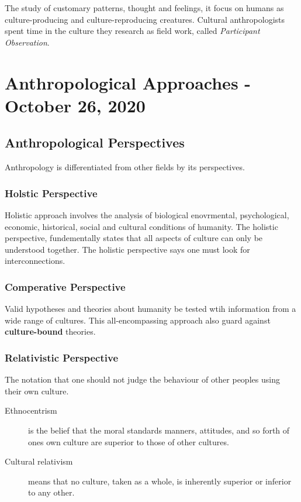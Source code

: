 \documentclass[11pt,a4paper]{book}
\begin{document}
The study of customary patterns, thought and feelings, it focus on humans as culture-producing and culture-reproducing creatures. Cultural anthropologists spent time in the culture they research as field work, called \textit{Participant Observation}\unsure.

\chapter{Anthropological Approaches - October 26, 2020}

\section{Anthropological Perspectives}

Anthropology is differentiated from other fields by its perspectives.

\subsection{Holstic Perspective}

Holistic approach involves the analysis of biological enovrmental, psychological, economic, historical, social and cultural conditions of humanity. The holistic perspective, fundementally states that all aspects of culture can only be understood together. The holistic perspective says one must look for interconnections.

\subsection{Comperative Perspective}

Valid hypotheses and theories about humanity be tested wtih information from a wide range of cultures. This all-encompassing approach also guard against \textbf{culture-bound} theories.

\subsection{Relativistic Perspective}

The notation that one should not judge the behaviour of other peoples using their own culture.

\begin{description}
\item[Ethnocentrism] is the belief that the moral standards manners, attitudes, and so forth of ones own culture are superior to those of other cultures.
\item[Cultural relativism] means that no culture, taken as a whole, is inherently superior or inferior to any other.
\end{description}
\end{document}
